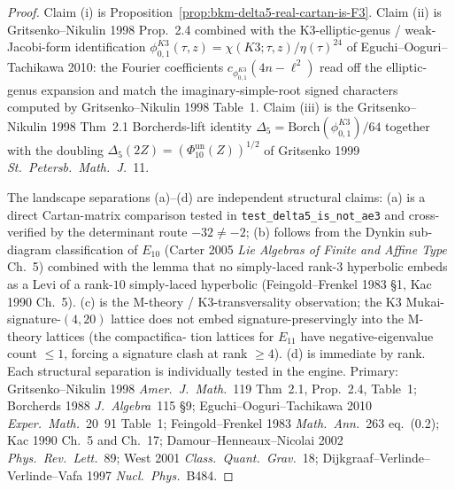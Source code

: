 \begin{proof}
Claim (i) is Proposition~\ref{prop:bkm-delta5-real-cartan-is-F3}.
Claim (ii) is Gritsenko--Nikulin 1998 Prop.~2.4 combined with the
K3-elliptic-genus / weak-Jacobi-form identification
$\phi_{0,1}^{K3}(\tau, z) = \chi(K3; \tau, z) / \eta(\tau)^{24}$ of
Eguchi--Ooguri--Tachikawa 2010: the Fourier coefficients
$c_{\phi_{0,1}^{K3}}(4n - \ell^2)$ read off the elliptic-genus
	expansion and match the imaginary-simple-root signed characters computed
by Gritsenko--Nikulin 1998 Table~1. Claim (iii) is the
Gritsenko--Nikulin 1998 Thm~2.1 Borcherds-lift identity
$\Delta_5 = \mathrm{Borch}(\phi_{0,1}^{K3}) / 64$ together with the
doubling \(\Delta_5(2Z) = (\Phi_{10}^{\mathrm{un}}(Z))^{1/2}\) of Gritsenko 1999
\emph{St.\ Petersb.\ Math.\ J.}~11.

The landscape separations (a)--(d) are independent structural claims:
(a) is a direct Cartan-matrix comparison tested in
\texttt{test\_delta5\_is\_not\_ae3} and cross-verified by the
determinant route $-32 \neq -2$; (b) follows from the Dynkin
sub-diagram classification of $E_{10}$ (Carter 2005
\emph{Lie Algebras of Finite and Affine Type} Ch.~5) combined with
the lemma that no simply-laced rank-$3$ hyperbolic embeds as a Levi
of a rank-$10$ simply-laced hyperbolic (Feingold--Frenkel 1983 \S1,
Kac 1990 Ch.~5). (c) is the M-theory / K3-transversality
observation; the K3 Mukai-signature-$(4, 20)$ lattice does not embed
signature-preservingly into the M-theory lattices (the compactifica-
tion lattices for $E_{11}$ have negative-eigenvalue count $\leq 1$,
forcing a signature clash at rank $\geq 4$). (d) is immediate by
rank. Each structural separation is individually tested in the
engine. Primary: Gritsenko--Nikulin 1998 \emph{Amer.\ J.\ Math.}~119
Thm~2.1, Prop.~2.4, Table~1; Borcherds 1988 \emph{J.\ Algebra}~115
\S9; Eguchi--Ooguri--Tachikawa 2010 \emph{Exper.\ Math.}~20~91
Table~1; Feingold--Frenkel 1983 \emph{Math.\ Ann.}~263 eq.~(0.2);
Kac 1990 Ch.~5 and Ch.~17; Damour--Henneaux--Nicolai 2002
\emph{Phys.\ Rev.\ Lett.}~89; West 2001 \emph{Class.\ Quant.\ Grav.}~18;
Dijkgraaf--Verlinde--Verlinde--Vafa 1997
\emph{Nucl.\ Phys.}~B484.
\end{proof}

